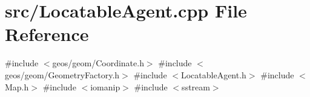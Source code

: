 \section{src/\+Locatable\+Agent.cpp File Reference}
\label{_locatable_agent_8cpp}
{\ttfamily \#include $<$geos/geom/\+Coordinate.\+h$>$}\newline
{\ttfamily \#include $<$geos/geom/\+Geometry\+Factory.\+h$>$}\newline
{\ttfamily \#include $<$Locatable\+Agent.\+h$>$}\newline
{\ttfamily \#include $<$Map.\+h$>$}\newline
{\ttfamily \#include $<$iomanip$>$}\newline
{\ttfamily \#include $<$sstream$>$}\newline

